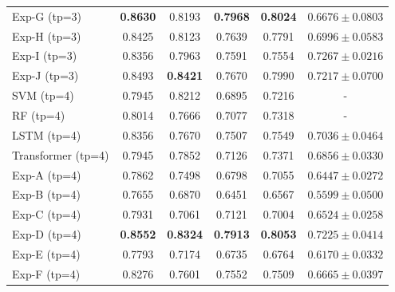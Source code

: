 \begin{table}[htbp]
{\begin{tabular}{l c c c c c}
  Exp-G (tp=3) & \textbf{0.8630} & 0.8193 & \textbf{0.7968} & \textbf{0.8024} & $0.6676 \pm 0.0803$ \\
  Exp-H (tp=3) & 0.8425 & 0.8123 & 0.7639 & 0.7791 & $0.6996 \pm 0.0583$ \\
  Exp-I (tp=3) & 0.8356 & 0.7963 & 0.7591 & 0.7554 & $0.7267 \pm 0.0216$ \\
  Exp-J (tp=3) & 0.8493 & \textbf{0.8421} & 0.7670 & 0.7990 & $0.7217 \pm 0.0700$ \\
  \midrule
  SVM (tp=4) & 0.7945 & 0.8212 & 0.6895 & 0.7216 & - \\
  RF (tp=4) & 0.8014 & 0.7666 & 0.7077 & 0.7318 & - \\
  LSTM (tp=4) & 0.8356 & 0.7670 & 0.7507 & 0.7549 & $0.7036 \pm 0.0464$ \\
  Transformer (tp=4) & 0.7945 & 0.7852 & 0.7126 & 0.7371 & $0.6856 \pm 0.0330$ \\
  Exp-A (tp=4) & 0.7862 & 0.7498 & 0.6798 & 0.7055 & $0.6447 \pm 0.0272$ \\
  Exp-B (tp=4) & 0.7655 & 0.6870 & 0.6451 & 0.6567 & $0.5599 \pm 0.0500$ \\
  Exp-C (tp=4) & 0.7931 & 0.7061 & 0.7121 & 0.7004 & $0.6524 \pm 0.0258$ \\
  Exp-D (tp=4) & \textbf{0.8552} & \textbf{0.8324} & \textbf{0.7913} & \textbf{0.8053} & $0.7225 \pm 0.0414$ \\
  Exp-E (tp=4) & 0.7793 & 0.7174 & 0.6735 & 0.6764 & $0.6170 \pm 0.0332$ \\
  Exp-F (tp=4) & 0.8276 & 0.7601 & 0.7552 & 0.7509 & $0.6665 \pm 0.0397$ \\
\bottomrule
\end{tabular}%
}
\end{table}
